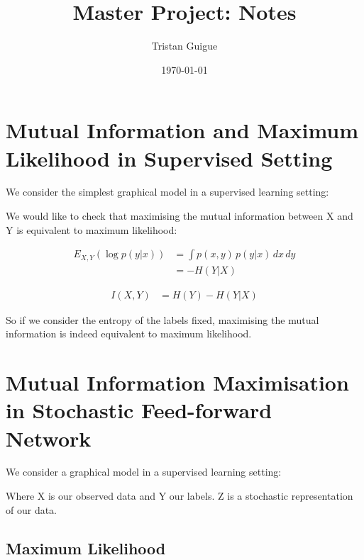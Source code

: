 \documentclass[a4paper]{article}
\title{Master Project: Notes}
\author{Tristan Guigue}
\date{\today}
\begin{document}
\maketitle

\section{Mutual Information and Maximum Likelihood in Supervised Setting}

We consider the simplest graphical model in a supervised learning setting:

\begin{center}
\end{center}

We would like to check that maximising the mutual information between X and Y is equivalent to maximum likelihood:

\begin{align}
E_{X, Y}(\log p(y|x)) &= \int p(x, y)\,p(y| x)\, dx\,dy\\ 
&= - H(Y | X)\
\end{align}


\begin{align}
I(X, Y) &= H(Y) - H(Y|X)
\end{align}

So if we consider the entropy of the labels fixed, maximising the mutual information is indeed equivalent to maximum likelihood.

\section{Mutual Information Maximisation in Stochastic Feed-forward Network}

We consider a graphical model in a supervised learning setting:

\begin{figure}[H]
  \centering
\end{figure}

Where X is our observed data and Y our labels. Z is a stochastic representation of our data.

\subsection{Maximum Likelihood}
\end{document}
